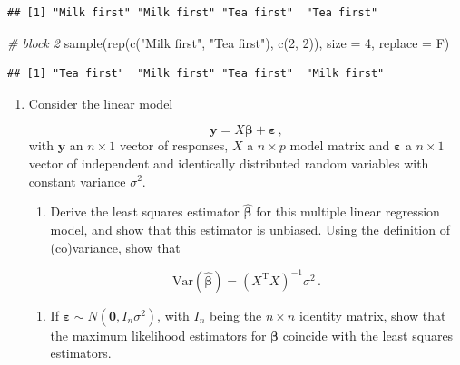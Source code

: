 \documentclass[
]{book}
\newenvironment{Shaded}{\begin{snugshade}}{\end{snugshade}}
\newcommand{\AttributeTok}[1]{\textcolor[rgb]{0.77,0.63,0.00}{#1}}
\newcommand{\CommentTok}[1]{\textcolor[rgb]{0.56,0.35,0.01}{\textit{#1}}}
\newcommand{\DecValTok}[1]{\textcolor[rgb]{0.00,0.00,0.81}{#1}}
\newcommand{\FunctionTok}[1]{\textcolor[rgb]{0.00,0.00,0.00}{#1}}
\newcommand{\NormalTok}[1]{#1}
\newcommand{\StringTok}[1]{\textcolor[rgb]{0.31,0.60,0.02}{#1}}
\providecommand{\tightlist}{%
  \setlength{\itemsep}{0pt}\setlength{\parskip}{0pt}}
\theoremstyle{definition}
\theoremstyle{definition}
\theoremstyle{definition}
\theoremstyle{definition}
\theoremstyle{remark}
\begin{document}
\begin{enumerate}
\begin{verbatim}
## [1] "Milk first" "Milk first" "Tea first"  "Tea first"
\end{verbatim}

\begin{Shaded}
\begin{Highlighting}[]
\CommentTok{\# block 2}
\FunctionTok{sample}\NormalTok{(}\FunctionTok{rep}\NormalTok{(}\FunctionTok{c}\NormalTok{(}\StringTok{"Milk first"}\NormalTok{, }\StringTok{"Tea first"}\NormalTok{), }\FunctionTok{c}\NormalTok{(}\DecValTok{2}\NormalTok{, }\DecValTok{2}\NormalTok{)), }\AttributeTok{size =} \DecValTok{4}\NormalTok{, }\AttributeTok{replace =}\NormalTok{ F)}
\end{Highlighting}
\end{Shaded}

\begin{verbatim}
## [1] "Tea first"  "Milk first" "Tea first"  "Milk first"
\end{verbatim}
\end{enumerate}

\begin{enumerate}
\def\labelenumi{\arabic{enumi}.}
\setcounter{enumi}{1}
\item
  Consider the linear model

  \[\boldsymbol{y}= X\boldsymbol{\beta}+ \boldsymbol{\varepsilon}\,,\]
  with \(\boldsymbol{y}\) an \(n\times 1\) vector of responses, \(X\) a \(n\times p\) model matrix and \(\boldsymbol{\varepsilon}\) a \(n\times 1\) vector of independent and identically distributed random variables with constant variance \(\sigma^2\).

  \begin{enumerate}
  \def\labelenumii{\alph{enumii}.}
  \tightlist
  \item
    Derive the least squares estimator \(\hat{\boldsymbol{\beta}}\) for this multiple linear regression model, and show that this estimator is unbiased. Using the definition of (co)variance, show that
  \end{enumerate}

  \[\mbox{Var}(\hat{\boldsymbol{\beta}}) = \left(X^{\mathrm{T}}X\right)^{-1}\sigma^2\,.\]

  \begin{enumerate}
  \def\labelenumii{\alph{enumii}.}
  \setcounter{enumii}{1}
  \tightlist
  \item
    If \(\boldsymbol{\varepsilon}\sim N (\boldsymbol{0},I_n\sigma^2)\), with \(I_n\) being the \(n\times n\) identity matrix, show that the maximum likelihood estimators for \(\boldsymbol{\beta}\) coincide with the least squares estimators.
  \end{enumerate}
\end{enumerate}
\end{document}
